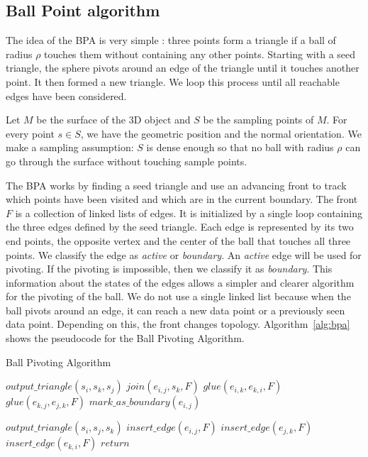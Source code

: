 \documentclass[a4paper]{article}
\begin{document}
\subsection{Ball Point algorithm}
The idea of the BPA is very simple : three points form a triangle if a ball of radius $\rho$ touches them without containing any other points. Starting with a seed triangle, the sphere pivots around an edge of the triangle until it touches another point. It then formed a new triangle. We loop this process until all reachable edges have been considered.

Let $M$ be the surface of the 3D object and $S$ be the sampling points of $M$. For every point $s \in S$, we have the geometric position and the normal orientation. We make a sampling assumption: $S$ is dense enough so that no ball with radius $\rho$ can go through the surface without touching sample points.


The BPA works by finding a seed triangle and use an advancing front to track which points have been visited and which are in the current boundary. The front $F$ is a collection of linked lists of edges. It is initialized by a single loop containing the three edges defined by the seed triangle. Each edge is represented by its two end points, the opposite vertex and the center of the ball that touches all three points. We classify the edge as \textit{active} or \textit{boundary}. An \textit{active} edge will be used for pivoting. If the pivoting is impossible, then we classify it as \textit{boundary}. This information about the states of the edges allows a simpler and clearer algorithm for the pivoting of the ball. We do not use a single linked list because when the ball pivots around an edge, it can reach a new data point or a previously seen data point. Depending on this, the front changes topology. Algorithm~\ref{alg:bpa} shows the pseudocode for the Ball Pivoting Algorithm.

\begin{algorithm}
\caption{Ball Pivoting Algorithm}
\label{alg:bpa}
\begin{algorithmic}[5]
      \State $output\_triangle(s_i, s_k, s_j)$
      \State $join(e_{i,j}, s_k, F)$
        \State $glue(e_{i,k}, e_{k,i}, F)$
      \EndIf
        \State $glue(e_{k,j}, e_{j,k}, F)$
      \EndIf
    \Else
      \State $mark\_as\_boundary(e_{i,j})$
    \EndIf
  \EndWhile

    \State $output\_triangle(s_i, s_j, s_k)$
    \State $insert\_edge(e_{i,j}, F)$
    \State $insert\_edge(e_{j,k}, F)$
    \State $insert\_edge(e_{k,i}, F)$
  \Else
    \State $return$
  \EndIf
\EndWhile
\end{algorithmic}
\end{algorithm} 
\end{document}
